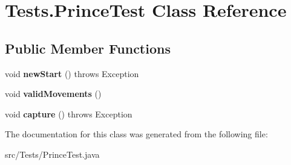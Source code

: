 \hypertarget{class_tests_1_1_prince_test}{}\section{Tests.\+Prince\+Test Class Reference}
\label{class_tests_1_1_prince_test}
\subsection*{Public Member Functions}
\begin{DoxyCompactItemize}
\item 
\mbox{\label{class_tests_1_1_prince_test_acddbc9b6d3180b184dff82127b9e825e}} 
void {\bfseries new\+Start} ()  throws Exception
\item 
\mbox{\label{class_tests_1_1_prince_test_a7b51e0bc503e990d07db7ae56fd89121}} 
void {\bfseries valid\+Movements} ()
\item 
\mbox{\label{class_tests_1_1_prince_test_ab057f00ed482d5526e13c94faf61537d}} 
void {\bfseries capture} ()  throws Exception 
\end{DoxyCompactItemize}


The documentation for this class was generated from the following file\+:\begin{DoxyCompactItemize}
\item 
src/\+Tests/Prince\+Test.\+java\end{DoxyCompactItemize}
